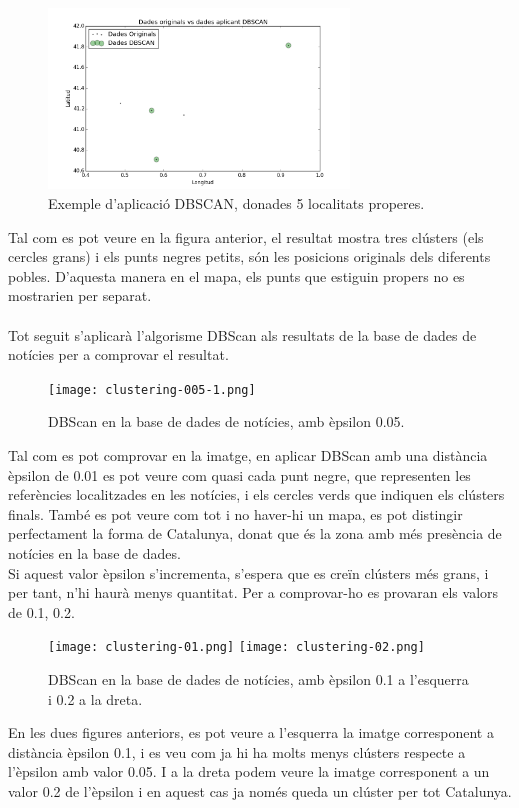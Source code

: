 \documentclass[12pt,a4paper,openright,oneside]{article}
\numberwithin{equation}{section}
\theoremstyle{definition}
\begin{document}
\begin{figure}[!htbp]
\centering
\includegraphics[width=8cm]{dbscan.png}
\caption{Exemple d'aplicació DBSCAN, donades 5 localitats properes.}
\end{figure}
Tal com es pot veure en la figura anterior, el resultat mostra tres clústers (els cercles grans) i els punts negres petits, són les posicions originals dels diferents pobles. D'aquesta manera en el mapa, els punts que estiguin propers no es mostrarien per separat.\\\\
Tot seguit s'aplicarà l'algorisme DBScan als resultats de la base de dades de notícies per a comprovar el resultat.
\begin{figure}[htbp]
\centering
\texttt{[image: clustering-005-1.png]}
\caption{DBScan en la base de dades de notícies, amb èpsilon 0.05.}
\end{figure}
Tal com es pot comprovar en la imatge, en aplicar DBScan amb una distància èpsilon de 0.01 es pot veure com quasi cada punt negre, que representen les referències localitzades en les notícies, i els cercles verds que indiquen els clústers finals. També es pot veure com tot i no haver-hi un mapa, es pot distingir perfectament la forma de Catalunya, donat que és la zona amb més presència de notícies en la base de dades.\\
\newpage
Si aquest valor èpsilon s'incrementa, s'espera que es creïn clústers més grans, i per tant, n'hi haurà menys quantitat. Per a comprovar-ho es provaran els valors de 0.1, 0.2.

\begin{figure}[htbp]
\centering
\texttt{[image: clustering-01.png]}
\texttt{[image: clustering-02.png]}
\caption{DBScan en la base de dades de notícies, amb èpsilon 0.1 a l'esquerra i 0.2 a la dreta.}
\end{figure}
En les dues figures anteriors, es pot veure a l'esquerra la imatge corresponent a distància èpsilon 0.1, i es veu com ja hi ha molts menys clústers respecte a l'èpsilon amb valor 0.05. I a la dreta podem veure la imatge corresponent a un valor 0.2 de l'èpsilon i en aquest cas ja només queda un clúster per tot Catalunya\cite{dbscan}.
\newpage
\end{document}
